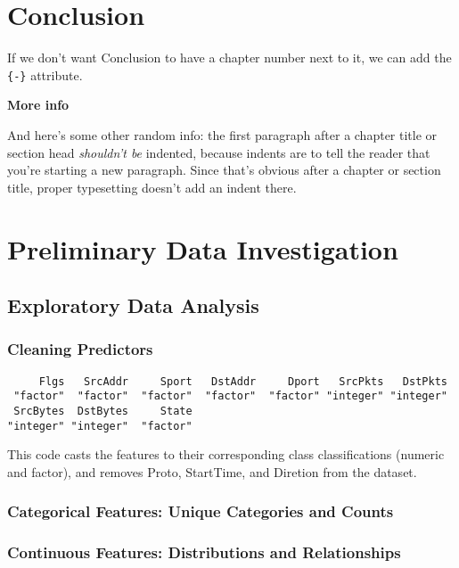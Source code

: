 \documentclass[12pt,twoside]{dukestatscithesis}
\theoremstyle{definition}
\theoremstyle{definition}
\theoremstyle{definition}
\theoremstyle{remark}
\begin{document}
\chapter*{Conclusion}\label{conclusion}

If we don't want Conclusion to have a chapter number next to it, we can
add the \texttt{\{-\}} attribute.

\textbf{More info}

And here's some other random info: the first paragraph after a chapter
title or section head \emph{shouldn't be} indented, because indents are
to tell the reader that you're starting a new paragraph. Since that's
obvious after a chapter or section title, proper typesetting doesn't add
an indent there.

\appendix

\chapter{Preliminary Data
Investigation}\label{preliminary-data-investigation}

\section{Exploratory Data Analysis}\label{exploratory-data-analysis}

\subsection{Cleaning Predictors}\label{cleaning-predictors}
\begin{verbatim}
     Flgs   SrcAddr     Sport   DstAddr     Dport   SrcPkts   DstPkts 
 "factor"  "factor"  "factor"  "factor"  "factor" "integer" "integer" 
 SrcBytes  DstBytes     State 
"integer" "integer"  "factor" 
\end{verbatim}
This code casts the features to their corresponding class
classifications (numeric and factor), and removes Proto, StartTime, and
Diretion from the dataset.

\subsection{Categorical Features: Unique Categories and
Counts}\label{categorical-features-unique-categories-and-counts}

\subsection{Continuous Features: Distributions and
Relationships}\label{continuous-features-distributions-and-relationships}
\end{document}
